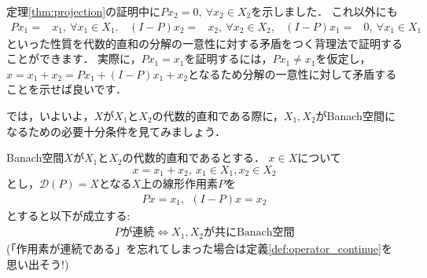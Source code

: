 定理\ref{thm:projection}の証明中に$P x_2 = 0, ~ \forall x_2 \in X_2$を示しました．
これ以外にも
\begin{align*}
	P x_1 =& x_1, ~  \forall x_1 \in X_1, & (I - P) x_2 =& x_2, ~  \forall x_2 \in X_2, & (I - P) x_1 =& 0, ~  \forall x_1 \in X_1
\end{align*}
といった性質を代数的直和の分解の一意性に対する矛盾をつく背理法で証明することができます．
実際に，$P x_1 = x_1$を証明するには，$P x_1 \neq x_1$を仮定し，$x = x_1 + x_2 = P x_1 + (I - P)x_1 + x_2$となるため分解の一意性に対して矛盾することを示せば良いです．

では，いよいよ，$X$が$X_1$と$X_2$の代数的直和である際に，$X_1,  X_2$がBanach空間になるための必要十分条件を見てみましょう．

\begin{Thm}
Banach空間$X$が$X_1$と$X_2$の代数的直和であるとする．
$x \in X$について
\[
x = x_1 + x_2, ~ x_1 \in X_1, x_2 \in X_2
\]
とし，${\mathcal D}(P) = X$となる$X$上の線形作用素$P$を
\begin{align*}
	P x = x_1,~ ~ (I - P)x = x_2
\end{align*}
とすると以下が成立する:
\begin{align*}
	P\mbox{が連続} \Leftrightarrow X_1, X_2\mbox{が共にBanach空間}
\end{align*}
(「作用素が連続である」を忘れてしまった場合は定義\ref{def:operator_continue}を思い出そう!)

\end{Thm}

